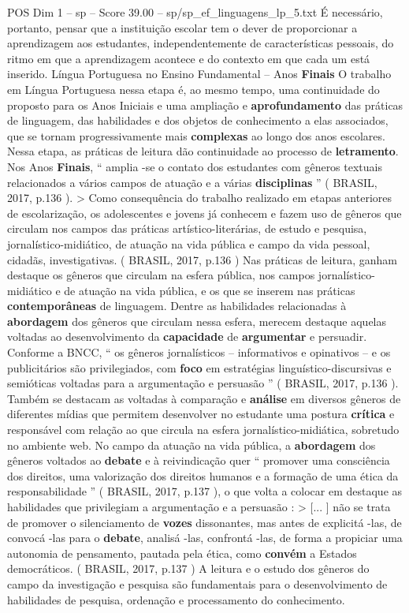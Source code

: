 \begin{textsample}{POS Dim 1 – sp – Score 39.00 – sp/sp\_ef\_linguagens\_lp\_5.txt}
É necessário, portanto, pensar que a instituição escolar tem o dever de proporcionar a aprendizagem aos estudantes, independentemente de características pessoais, do ritmo em que a aprendizagem acontece e do contexto em que cada um está inserido.
Língua Portuguesa no Ensino Fundamental – Anos \textbf{Finais} O trabalho em Língua Portuguesa nessa etapa é, ao mesmo tempo, uma continuidade do proposto para os Anos Iniciais e uma ampliação e \textbf{aprofundamento} das práticas de linguagem, das habilidades e dos objetos de conhecimento a elas associados, que se tornam progressivamente mais \textbf{complexas} ao longo dos anos escolares.
Nessa etapa, as práticas de leitura dão continuidade ao processo de \textbf{letramento}.
Nos Anos \textbf{Finais}, “ amplia -se o contato dos estudantes com gêneros textuais relacionados a vários campos de atuação e a várias \textbf{disciplinas} ” ( BRASIL, 2017, p.136 ). > Como consequência do trabalho realizado em etapas anteriores de escolarização, os adolescentes e jovens já conhecem e fazem uso de gêneros que circulam nos campos das práticas artístico-literárias, de estudo e pesquisa, jornalístico-midiático, de atuação na vida pública e campo da vida pessoal, cidadãs, investigativas. ( BRASIL, 2017, p.136 ) Nas práticas de leitura, ganham destaque os gêneros que circulam na esfera pública, nos campos jornalístico-midiático e de atuação na vida pública, e os que se inserem nas práticas \textbf{contemporâneas} de linguagem.
Dentre as habilidades relacionadas à \textbf{abordagem} dos gêneros que circulam nessa esfera, merecem destaque aquelas voltadas ao desenvolvimento da \textbf{capacidade} de \textbf{argumentar} e persuadir.
Conforme a BNCC, “ os gêneros jornalísticos – informativos e opinativos – e os publicitários são privilegiados, com \textbf{foco} em estratégias linguístico-discursivas e semióticas voltadas para a argumentação e persuasão ” ( BRASIL, 2017, p.136 ).
Também se destacam as voltadas à comparação e \textbf{análise} em diversos gêneros de diferentes mídias que permitem desenvolver no estudante uma postura \textbf{crítica} e responsável com relação ao que circula na esfera jornalístico-midiática, sobretudo no ambiente web.
No campo da atuação na vida pública, a \textbf{abordagem} dos gêneros voltados ao \textbf{debate} e à reivindicação quer “ promover uma consciência dos direitos, uma valorização dos direitos humanos e a formação de uma ética da responsabilidade ” ( BRASIL, 2017, p.137 ), o que volta a colocar em destaque as habilidades que privilegiam a argumentação e a persuasão : > [... ] não se trata de promover o silenciamento de \textbf{vozes} dissonantes, mas antes de explicitá -las, de convocá -las para o \textbf{debate}, analisá -las, confrontá -las, de forma a propiciar uma autonomia de pensamento, pautada pela ética, como \textbf{convém} a Estados democráticos. ( BRASIL, 2017, p.137 ) A leitura e o estudo dos gêneros do campo da investigação e pesquisa são fundamentais para o desenvolvimento de habilidades de pesquisa, ordenação e processamento do conhecimento.

\end{textsample}
